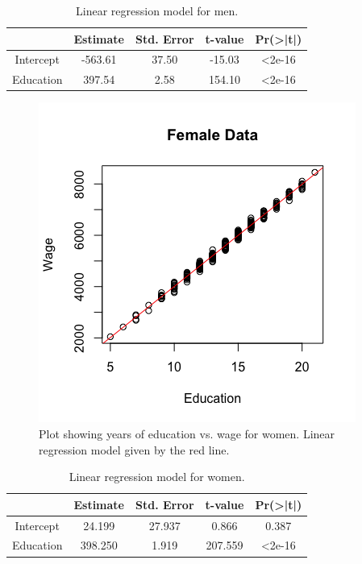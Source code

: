 \documentclass{paper}
\begin{document}
\begin{table}[!h]
  \centering
    \caption{Linear regression model for men.}
    \label{tab:male}
    \begin{tabular}{|c|c|c|c|c|}
      \hline
                & Estimate  & Std. Error  & t-value & Pr(>|t|)    \\ \hline
      Intercept & -563.61    & 37.50      & -15.03  & <2e-16       \\ \hline
      Education & 397.54    & 2.58        & 154.10  & <2e-16      \\ \hline
    \end{tabular}
\end{table}

\begin{figure}[!h]
  \begin{center}
    \quad\quad
    \includegraphics[width=.6\linewidth]{female_plot}
  \end{center}
  \caption{Plot showing years of education vs. wage for women. Linear regression
   model given by the red line.}
   \label{fig:female}
\end{figure}

\begin{table}[!h]
  \centering
    \caption{Linear regression model for women.}
    \label{tab:female}
    \begin{tabular}{|c|c|c|c|c|}
      \hline
                & Estimate  & Std. Error  & t-value  & Pr(>|t|)    \\ \hline
      Intercept & 24.199    & 27.937      &  0.866   & 0.387       \\ \hline
      Education & 398.250   & 1.919       &  207.559  & <2e-16      \\ \hline
    \end{tabular}
\end{table}
\end{document}
